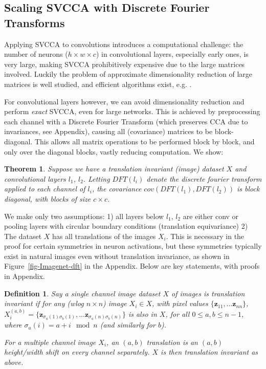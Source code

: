 \documentclass{article} %
\newtheorem{theorem}{Theorem}
\newtheorem{definition}{Definition}
\begin{document}
\subsection{Scaling SVCCA with Discrete Fourier Transforms}
\label{sec-SVCCA-scale}

Applying SVCCA to convolutions introduces a computational challenge: the number of neurons ($h \times w \times c$) in convolutional layers, especially early ones, is very large, making SVCCA prohibitively expensive due to the large matrices involved. Luckily the problem of approximate dimensionality reduction of large matrices is well studied, and efficient algorithms exist, e.g. \cite{tropp2009randommatrices}.


For convolutional layers however, we can avoid dimensionality reduction and perform {\em exact} SVCCA, even for large networks. 
This is achieved by preprocessing each channel with a Discrete Fourier Transform (which preserves CCA due to invariances, see Appendix), causing all (covariance) matrices to be block-diagonal. This allows all matrix operations to be performed block by block, and only over the diagonal blocks, vastly reducing computation. We show:

\begin{theorem}
\label{thm_block_cov}
Suppose we have a translation invariant (image) dataset $X$ and convolutional layers $l_1$, $l_2$. Letting $DFT(l_i)$ denote the discrete fourier transform applied to each channel of $l_i$, the covariance $cov(DFT(l_1), DFT(l_2))$ is block diagonal, with blocks of size $c \times c$.
\end{theorem}

We make only two assumptions: 1) all layers below $l_1$, $l_2$ are either conv or pooling layers with circular boundary conditions (translation equivariance) 2) The dataset $X$ has all translations of the images $X_i$. This is necessary in the proof for certain symmetries in neuron activations, but these symmetries typically exist in natural images even without translation invariance, as shown in Figure~\ref{fig-Imagenet-dft} in the Appendix. Below are key statements, with proofs in Appendix.

\begin{definition}
Say a single channel image dataset $X$ of images is \textit{translation invariant} if for any (wlog $n \times n$) image $X_i \in X$, with pixel values $\{ \pmb{z}_{11},...\pmb{z}_{nn} \}$, $X^{(a,b)}_i = \{ \pmb{z}_{\sigma_a(1)\sigma_b(1)},...\pmb{z}_{\sigma_a(n)\sigma_b(n)} \}$ is also in $X$, for all $ 0 \leq a,b \leq n-1$, where $\sigma_a(i) = a + i \mod n$ (and similarly for $b$).

For a multiple channel image $X_i$, an $(a,b)$ translation is an $(a,b)$ height/width shift on every channel separately. $X$ is then translation invariant as above.
\end{definition}
\end{document}
